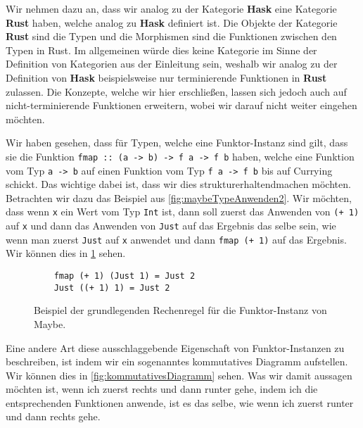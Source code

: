 \documentclass{hhuarticle}
\theoremstyle{definition}
\theoremstyle{theorem}
\begin{document}
  Wir nehmen dazu an, dass wir analog zu der Kategorie \textbf{Hask}
  eine Kategorie \textbf{Rust} haben, welche analog zu \textbf{Hask}
  definiert ist. Die Objekte der Kategorie \textbf{Rust} sind die
  Typen und die Morphismen sind die Funktionen zwischen den Typen in
  Rust. Im allgemeinen würde dies keine Kategorie im Sinne der Definition
  von Kategorien aus der Einleitung sein, weshalb wir analog zu der
  Definition von \textbf{Hask} beispielsweise nur terminierende Funktionen
  in \textbf{Rust} zulassen. Die Konzepte, welche wir hier erschließen,
  lassen sich jedoch auch auf nicht-terminierende Funktionen erweitern,
  wobei wir darauf nicht weiter eingehen möchten.

  Wir haben gesehen, dass für Typen, welche eine Funktor-Instanz sind
  gilt, dass sie die Funktion \verb|fmap :: (a -> b) -> f a -> f b| haben,
  welche eine Funktion vom Typ \verb|a -> b| auf einen Funktion vom Typ
  \verb|f a -> f b| bis auf Currying schickt. Das wichtige dabei ist,
  dass wir dies \glqq strukturerhaltend\grqq  machen möchten. Betrachten wir
  dazu das Beispiel aus \cref{fig:maybeTypeAnwenden2}. Wir möchten,
  dass wenn \verb|x| ein Wert vom Typ \verb|Int| ist, dann soll
  zuerst das Anwenden von \verb|(+ 1)| auf \verb|x| und dann das
  Anwenden von \verb|Just| auf das Ergebnis das selbe sein, wie wenn
  man zuerst \verb|Just| auf \verb|x| anwendet und dann \verb|fmap (+ 1)|
  auf das Ergebnis. Wir können dies in \cref{fig:kommutativitaetFunktor}
  sehen.

  \begin{figure}[h]

    \begin{verbatim}
    fmap (+ 1) (Just 1) = Just 2
    Just ((+ 1) 1) = Just 2
    \end{verbatim}
    \caption{Beispiel der grundlegenden Rechenregel für die Funktor-Instanz von \glqq Maybe\grqq .}%
    \label{fig:kommutativitaetFunktor}
  \end{figure}

  Eine andere Art diese ausschlaggebende Eigenschaft von Funktor-Instanzen
  zu beschreiben, ist indem wir ein sogenanntes \glqq kommutatives Diagramm\grqq 
  aufstellen. Wir können dies in \cref{fig:kommutativesDiagramm} sehen.
  Was wir damit aussagen möchten ist, wenn ich zuerst rechts und dann runter
  gehe, indem ich die entsprechenden Funktionen anwende, ist es das selbe,
  wie wenn ich zuerst runter und dann rechts gehe.
\end{document}
